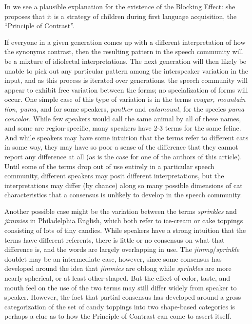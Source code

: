 In \citet{clark1987} we see a plausible explanation for the existence of the Blocking Effect: she proposes that it is a strategy of children during first language acquisition, the ``Principle of Contrast''. %

If everyone in a given generation comes up with a different interpretation of how the synonyms contrast, then the resulting pattern in the speech community will be a mixture of idiolectal interpretations. The next generation will then likely be unable to pick out any particular pattern among the interspeaker variation in the input, and as this process is iterated over generations, the speech community will appear to exhibit free variation between the forms; no specialization of forms will occur. One simple case of this type of variation is in the terms \textsl{cougar, mountain lion, puma}, and for some speakers, \textsl{panther} and \textsl{catamount}, for the species \textsl{puma concolor}. While few speakers would call the same animal by all of these names, and some are region-specific, many speakers have 2-3 terms for the same feline. And while speakers may have some intuition that the terms refer to different cats in some way, they may have so poor a sense of the difference that they cannot report any difference at all (as is the case for one of the authors of this article). Until some of the terms drop out of use entirely in a particular speech community, different speakers may posit different interpretations, but the interpretations may differ (by chance) along so many possible dimensions of cat characteristics that a consensus is unlikely to develop in the speech community. 

Another possible case might be the variation between the terms \textsl{sprinkles} and \textsl{jimmies} in Philadelphia English, which both refer to ice-cream or cake toppings consisting of lots of tiny candies. While speakers have a strong intuition that the terms have different referents, there is little or no consensus on what that difference is, and the words are largely overlapping in use. The \textsl{jimmy}/\textsl{sprinkle} doublet may be an intermediate case, however, since some consensus has developed around the idea that \textsl{jimmies} are oblong while \textsl{sprinkles} are more nearly spherical, or at least other-shaped. But the effect of color, taste, and mouth feel on the use of the two terms may still differ widely from speaker to speaker. However, the fact that partial consensus has developed around a gross categorization of the set of candy toppings into two shape-based categories is perhaps a clue as to how the Principle of Contrast can come to assert itself.

